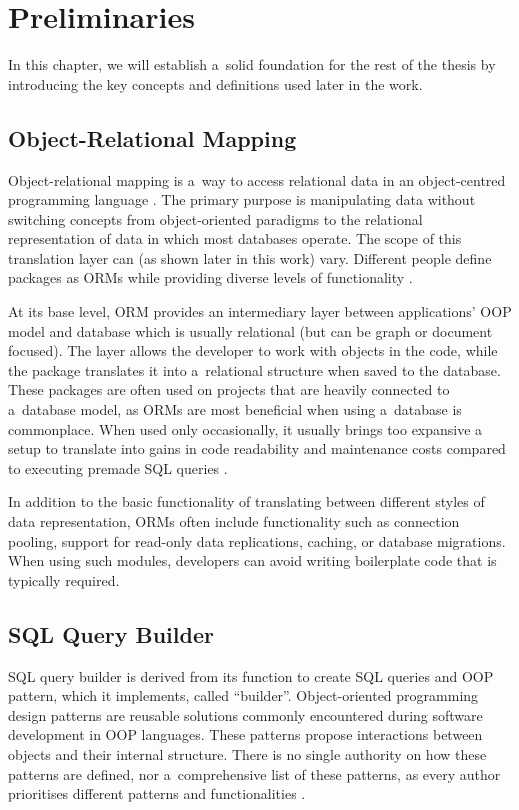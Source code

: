 \chapter{Preliminaries}

In this chapter, we will establish a~solid foundation for the rest of the thesis
by introducing the key concepts and definitions used later in the work.

\section*{Object-Relational Mapping}
Object-relational mapping is a~way to access relational data in an
object-centred programming language \cite{agile-mapping-objects}. The primary
purpose is manipulating data without switching concepts from object-oriented
paradigms to the relational representation of data in which most databases
operate. The scope of this translation layer can (as shown later in this work)
vary. Different people define packages as ORMs while providing diverse levels of
functionality \cite{artima-abstractions}.

At its base level, ORM provides an intermediary layer between applications' OOP
model and database which is usually relational (but can be graph or document
focused). The layer allows the developer to work with objects in the code, while
the package translates it into a~relational structure when saved to the
database. These packages are often used on projects that are heavily connected
to a~database model, as ORMs are most beneficial when using a~database is
commonplace. When used only occasionally, it usually brings too expansive a
setup to translate into gains in code readability and maintenance costs compared
to executing premade SQL queries \cite{Torres_Galante_Pimenta_Martins_2017}.

In addition to the basic functionality of translating between different styles
of data representation, ORMs often include functionality such as connection
pooling, support for read-only data replications, caching, or database
migrations. When using such modules, developers can avoid writing boilerplate
code that is typically required.


\section*{SQL Query Builder}
SQL query builder is derived from its function to create SQL queries and OOP
pattern, which it implements, called \enquote{builder}. Object-oriented
programming design patterns are reusable solutions commonly encountered during
software development in OOP languages. These patterns propose interactions
between objects and their internal structure. There is no single authority on
how these patterns are defined, nor a~comprehensive list of these patterns, as
every author prioritises different patterns and functionalities
\cite{fowler-patterns-2003}.

